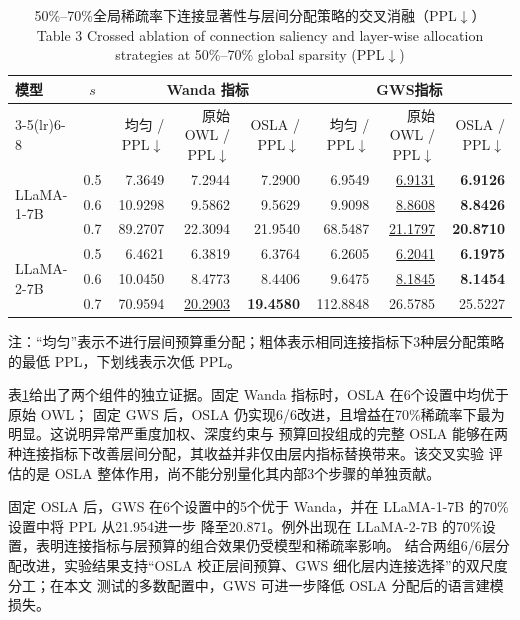 \documentclass[UTF8,fontset=fandol]{ctexart}
\renewcommand{\arraystretch}{1.08}
\newcommand{\gws}{\textsc{GWS}}
\newcommand{\best}[1]{\textbf{#1}}
\newcommand{\second}[1]{\underline{#1}}
\begin{document}
\begin{table}[!htbp]
\centering
\caption{50\%--70\%全局稀疏率下连接显著性与层间分配策略的交叉消融（PPL$\downarrow$）\\
Table 3 Crossed ablation of connection saliency and layer-wise allocation strategies at 50\%--70\% global sparsity (PPL$\downarrow$)}
\label{tab:ablation}
\scriptsize
\setlength{\tabcolsep}{4.2pt}
\renewcommand{\arraystretch}{0.98}
\begin{tabular*}{0.92\textwidth}{@{\extracolsep{\fill}}lcrrrrrr@{}}
\toprule
\multirow{2}{*}{模型} & \multirow{2}{*}{$s$} &
\multicolumn{3}{c}{Wanda 指标} & \multicolumn{3}{c}{\gws 指标} \\
\cmidrule(lr){3-5}\cmidrule(lr){6-8}
 & & 均匀 / PPL$\downarrow$ & 原始 OWL / PPL$\downarrow$ & OSLA / PPL$\downarrow$ & 均匀 / PPL$\downarrow$ & 原始 OWL / PPL$\downarrow$ & OSLA / PPL$\downarrow$ \\
\midrule
\multirow{3}{*}{LLaMA-1-7B}
 & 0.5 & 7.3649 & 7.2944 & 7.2900 & 6.9549 & \second{6.9131} & \best{6.9126} \\
 & 0.6 & 10.9298 & 9.5862 & 9.5629 & 9.9098 & \second{8.8608} & \best{8.8426} \\
 & 0.7 & 89.2707 & 22.3094 & 21.9540 & 68.5487 & \second{21.1797} & \best{20.8710} \\
\midrule
\multirow{3}{*}{LLaMA-2-7B}
 & 0.5 & 6.4621 & 6.3819 & 6.3764 & 6.2605 & \second{6.2041} & \best{6.1975} \\
 & 0.6 & 10.0450 & 8.4773 & 8.4406 & 9.6475 & \second{8.1845} & \best{8.1454} \\
 & 0.7 & 70.9594 & \second{20.2903} & \best{19.4580} & 112.8848 & 26.5785 & 25.5227 \\
\bottomrule
\end{tabular*}
\vspace{2pt}
\parbox{0.92\textwidth}{\scriptsize
注：“均匀”表示不进行层间预算重分配；粗体表示相同连接指标下3种层分配策略的最低 PPL，下划线表示次低 PPL。}
\end{table}

表\ref{tab:ablation}给出了两个组件的独立证据。固定 Wanda 指标时，OSLA 在6个设置中均优于原始 OWL；
固定 GWS 后，OSLA 仍实现6/6改进，且增益在70\%稀疏率下最为明显。这说明异常严重度加权、深度约束与
预算回投组成的完整 OSLA 能够在两种连接指标下改善层间分配，其收益并非仅由层内指标替换带来。该交叉实验
评估的是 OSLA 整体作用，尚不能分别量化其内部3个步骤的单独贡献。

固定 OSLA 后，GWS 在6个设置中的5个优于 Wanda，并在 LLaMA-1-7B 的70\%设置中将 PPL 从21.954进一步
降至20.871。例外出现在 LLaMA-2-7B 的70\%设置，表明连接指标与层预算的组合效果仍受模型和稀疏率影响。
结合两组6/6层分配改进，实验结果支持“OSLA 校正层间预算、GWS 细化层内连接选择”的双尺度分工；在本文
测试的多数配置中，GWS 可进一步降低 OSLA 分配后的语言建模损失。
\end{document}
